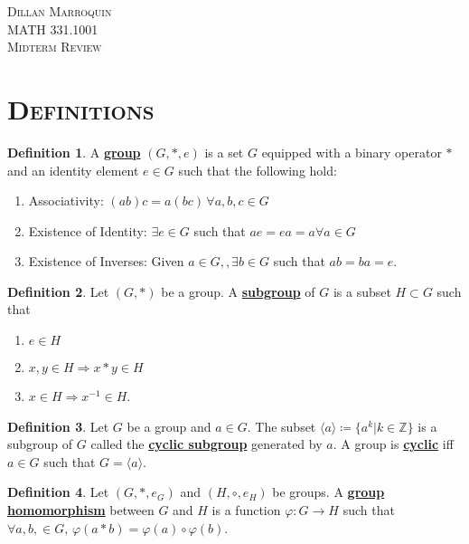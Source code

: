 \documentclass{article}
\newcommand{\Z}{\mathbb{Z}}
\newcommand{\coleq}{\coloneqq}
\newcommand{\inverse}[1]{#1^{-1}}
\newcommand{\define}[1]{\textbf{\underline{#1}}}
\newcommand{\func}[3]{#1: #2 \to #3}
\newcommand{\gen}[1]{\langle#1\rangle}
\theoremstyle{definition}
\newtheorem*{defn}{Definition}
\theoremstyle{remark}
\begin{document}
    \begin{center}
        \textsc{Dillan Marroquin\\MATH 331.1001\\Midterm Review}
    \end{center}
        
    \noindent\section*{\textbf{\textsc{Definitions}}}{
        \begin{defn}
            A \define{group} $(G,*,e)$ is a set $G$ equipped with a binary operator $*$ and an identity element $e \in G$ such that the following hold:
            \begin{enumerate}
                \item Associativity: $(ab)c=a(bc) \, \forall a,b,c \in G$
                \item Existence of Identity: $\exists e\in G$ such that $ae=ea=a \forall a \in G$
                \item Existence of Inverses: Given $a \in G, , \exists b \in G$ such that $ab=ba=e$.
            \end{enumerate}
        \end{defn}
        
        \begin{defn}
            Let $(G,*)$ be a group. A \define{subgroup} of $G$ is a subset $H \subset G$ such that
            \begin{enumerate}
                \item $e\in H$
                \item $x,y \in H \Rightarrow x*y \in H$
                \item $x\in H \Rightarrow \inverse{x} \in H$.
            \end{enumerate}
        \end{defn}
        
        \begin{defn}
            Let $G$ be a group and $a \in G$. The subset $\gen{a}\coleq \{a^k| k \in \Z\}$ is a subgroup of $G$ called the \define{cyclic subgroup} generated by $a$. A group is \define{cyclic} iff $a \in G$ such that $G=\gen{a}$.
        \end{defn}
        
        \begin{defn}
            Let $(G,*,e_G)$ and $(H,\circ,e_H)$ be groups. A \define{group homomorphism} between $G$ and $H$ is a function $\func{\varphi}{G}{H}$ such that $\forall a,b, \in G, \, \varphi(a*b)=\varphi(a)\circ\varphi(b)$.
        \end{defn}
        
}
\end{document}
